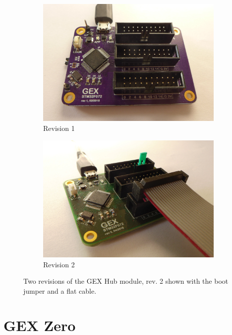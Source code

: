 \begin{figure}[h]
	\centering
	\begin{subfigure}{.5\textwidth}
		\centering
		\includegraphics[width=.98\linewidth]{img/photo-hub1.jpg}
		\caption{\label{fig:gexhub1}Revision 1}
	\end{subfigure}%
	\begin{subfigure}{.5\textwidth}
		\centering
		\includegraphics[width=.98\linewidth]{img/photo-hub2.jpg}
		\caption{\label{fig:gexhub2}Revision 2}
	\end{subfigure}
	\caption[The GEX Hub module]{\label{fig:gexhub} Two revisions of the GEX Hub module, rev. 2 shown with the boot jumper and a flat cable.}
\end{figure}


\section{GEX Zero}

